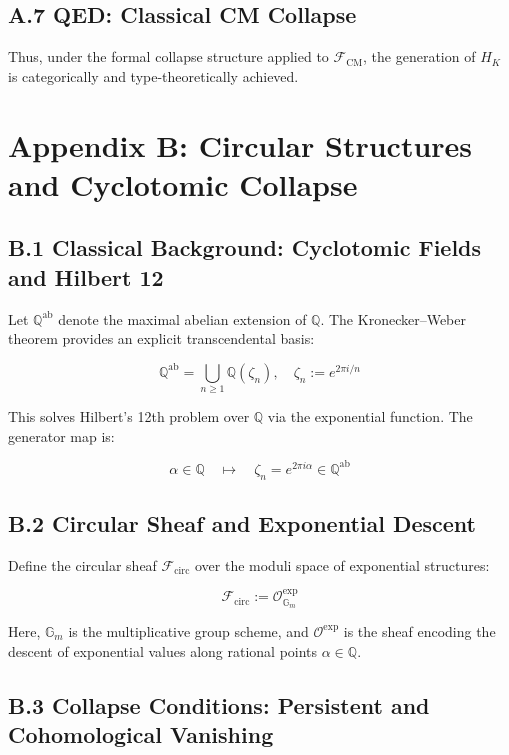 \documentclass[11pt]{article}
\begin{document}
\subsection*{A.7 QED: Classical CM Collapse}

Thus, under the formal collapse structure applied to \( \mathcal{F}_{\mathrm{CM}} \), the generation of \( H_K \) is categorically and type-theoretically achieved.



\appendix
\section*{Appendix B: Circular Structures and Cyclotomic Collapse}

\subsection*{B.1 Classical Background: Cyclotomic Fields and Hilbert 12}

Let \( \mathbb{Q}^{\mathrm{ab}} \) denote the maximal abelian extension of \( \mathbb{Q} \).  
The Kronecker–Weber theorem provides an explicit transcendental basis:

\[
\mathbb{Q}^{\mathrm{ab}} = \bigcup_{n \geq 1} \mathbb{Q}(\zeta_n), \quad \zeta_n := e^{2\pi i / n}
\]

This solves Hilbert's 12th problem over \( \mathbb{Q} \) via the exponential function.  
The generator map is:

\[
\alpha \in \mathbb{Q} \quad \mapsto \quad \zeta_n = e^{2\pi i \alpha} \in \mathbb{Q}^{\mathrm{ab}}
\]

\subsection*{B.2 Circular Sheaf and Exponential Descent}

Define the circular sheaf \( \mathcal{F}_{\mathrm{circ}} \) over the moduli space of exponential structures:

\[
\mathcal{F}_{\mathrm{circ}} := \mathcal{O}^{\exp}_{\mathbb{G}_m}
\]

Here, \( \mathbb{G}_m \) is the multiplicative group scheme, and \( \mathcal{O}^{\exp} \) is the sheaf encoding the descent of exponential values along rational points \( \alpha \in \mathbb{Q} \).

\subsection*{B.3 Collapse Conditions: Persistent and Cohomological Vanishing}
\end{document}
